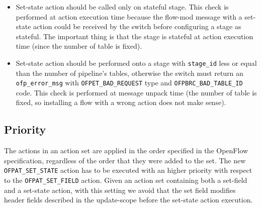 \begin{itemize}
    \item Set-state action should be called only on stateful stage. This check is performed at action execution time because the flow-mod message with a set-state action could be received by the switch before configuring a stage as stateful. The important thing is that the stage is stateful at action execution time (since the number of table is fixed).

    \item Set-state action should be performed onto a stage with \texttt{stage\_id} less or equal than the number of pipeline’s tables, otherwise the switch must return an \texttt{ofp\_error\_msg} with \texttt{OFPET\_BAD\_REQUEST} type and \texttt{OFPBRC\_BAD\_TABLE\_ID} code. This check is performed at message unpack time (the number of table is fixed, so installing a flow with a wrong action does not make sense).
\end{itemize}

\subsection{Priority}

The actions in an action set are applied in the order specified in the OpenFlow specification, regardless of the order that they were added to the set. The new \texttt{OFPAT\_SET\_STATE} action has to be executed with an higher priority with respect to the \texttt{OFPAT\_SET\_FIELD} action. Given an action set containing both a set-field and a set-state action, with this setting we avoid that the set field modifies header fields described in the update-scope before the set-state action execution.


